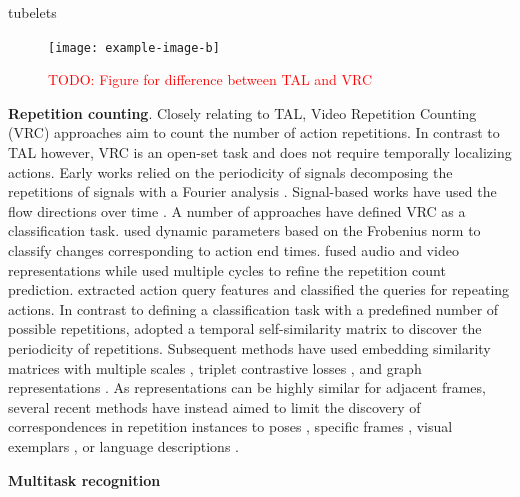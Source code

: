 \documentclass[smallextended,twocolumn,natbib]{svjour3}
\begin{document}
tubelets \citep{jain2014action}
\citep{kalogeiton2017action}
\citep{li2018recurrent}
\citep{li2020actions}
\citep{zhao2019dance}
\citep{song2019tacnet}
\citep{zhao2022tuber}
\citep{thoker2023tubelet}
\citep{hou2017tube}


\begin{figure}[t]
    \centering
    \texttt{[image: example-image-b]}
    \caption{\textcolor{red}{TODO: Figure for difference between TAL and VRC}}
\end{figure}

\noindent
\textbf{Repetition counting}. Closely relating to TAL, Video Repetition Counting (VRC) approaches aim to count the number of action repetitions. In contrast to TAL however, VRC is an open-set task and does not require temporally localizing actions. Early works relied on the periodicity of signals \citep{thangali2005periodic} decomposing the repetitions of signals with a Fourier analysis \citep{branzan2008generic,briassouli2007extraction,ousman2008segmentation,ross2000robust,pogalin2008visual}. Signal-based works have used the flow directions over time \citep{runia2018real}. A number of approaches have defined VRC as a classification task. \citet{lu2004repetitive} used dynamic parameters based on the Frobenius norm to classify changes corresponding to action end times.
\citet{zhang2021repetitive} fused audio and video representations while \citet{zhang2020context} used multiple cycles to refine the repetition count prediction. \citet{li2024efficient} extracted action query features and classified the queries for repeating actions. In contrast to defining a classification task with a predefined number of possible repetitions, \citet{dwibedi2020counting} adopted a temporal self-similarity matrix \citep{benabdelkader2004gait,junejo2010view,korner2013temporal} to discover the periodicity of repetitions. Subsequent methods have used embedding similarity matrices with multiple scales \citep{bacharidis2023repetition,hu2022transrac}, triplet contrastive losses \citep{destro2024cyclecl}, and graph representations \citep{panagiotakis2018unsupervised}. As representations can be highly similar for adjacent frames, several recent methods have instead aimed to limit the discovery of correspondences in repetition instances to poses \citep{ferreira2021deep,yao2023poserac}, specific frames \citep{li2024repetitive,zhao2024skim}, visual exemplars \citep{sinha2024every}, or language descriptions \citep{dwibedi2024ovr}.


\noindent
\textbf{Multitask recognition}
\citep{zhao2024videoprism}
\citep{cheng2024egothink}
\citep{wang2024omnivid}
\citep{kuo2023mammut}
\end{document}
